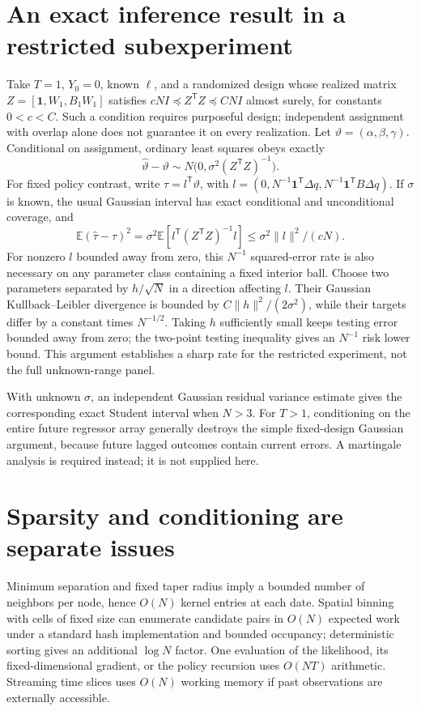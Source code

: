 \documentclass[11pt]{article}
\begin{document}
\section{An exact inference result in a restricted subexperiment}
Take $T=1$, $Y_0=0$, known $\ell$, and a randomized design whose realized matrix
$Z=[\mathbf1,W_1,B_1W_1]$ satisfies $cN I\preceq Z^{\mathsf T}Z\preceq CN I$ almost surely, for constants $0<c<C$. Such a condition requires purposeful design; independent assignment with overlap alone does not guarantee it on every realization. Let $\vartheta=(\alpha,\beta,\gamma)$. Conditional on assignment, ordinary least squares obeys exactly
\[
 \widehat\vartheta-\vartheta\sim
 N\bigl(0,\sigma^2(Z^{\mathsf T}Z)^{-1}\bigr).
\]
For fixed policy contrast, write $\tau=l^{\mathsf T}\vartheta$, with
$l=(0,N^{-1}\mathbf1^{\mathsf T}\Delta q,
N^{-1}\mathbf1^{\mathsf T}B\Delta q)$. If $\sigma$ is known, the usual Gaussian interval has exact conditional and unconditional coverage, and
\[
 \mathbb E(\widehat\tau-\tau)^2
   =\sigma^2\mathbb E[l^{\mathsf T}(Z^{\mathsf T}Z)^{-1}l]
   \leq\sigma^2\|l\|^2/(cN).
\]
For nonzero $l$ bounded away from zero, this $N^{-1}$ squared-error rate is also necessary on any parameter class containing a fixed interior ball. Choose two parameters separated by $h/\sqrt N$ in a direction affecting $l$. Their Gaussian Kullback--Leibler divergence is bounded by $C\|h\|^2/(2\sigma^2)$, while their targets differ by a constant times $N^{-1/2}$. Taking $h$ sufficiently small keeps testing error bounded away from zero; the two-point testing inequality gives an $N^{-1}$ risk lower bound. This argument establishes a sharp rate for the restricted experiment, not the full unknown-range panel.

With unknown $\sigma$, an independent Gaussian residual variance estimate gives the corresponding exact Student interval when $N>3$. For $T>1$, conditioning on the entire future regressor array generally destroys the simple fixed-design Gaussian argument, because future lagged outcomes contain current errors. A martingale analysis is required instead; it is not supplied here.

\section{Sparsity and conditioning are separate issues}
Minimum separation and fixed taper radius imply a bounded number of neighbors per node, hence $O(N)$ kernel entries at each date. Spatial binning with cells of fixed size can enumerate candidate pairs in $O(N)$ expected work under a standard hash implementation and bounded occupancy; deterministic sorting gives an additional $\log N$ factor. One evaluation of the likelihood, its fixed-dimensional gradient, or the policy recursion uses $O(NT)$ arithmetic. Streaming time slices uses $O(N)$ working memory if past observations are externally accessible.
\end{document}
